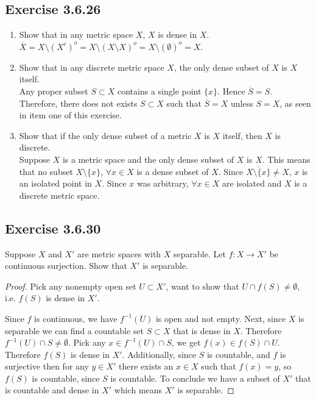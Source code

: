 \documentclass{tufte-book}
\theoremstyle{mytheoremstyle}
\theoremstyle{mylemstyle}
\theoremstyle{mydefstyle}
\begin{document}
\subsection{Exercise 3.6.26}
\begin{enumerate}

\item Show that in any metric space $X$, $X$ is dense in $X$.\\
$\overline{X} = X \setminus (X^c)^o = X\setminus(X \setminus X)^o = X\setminus (\emptyset)^o = X$.

\item Show that in any discrete metric space $X$, the only dense subset of $X$ is $X$ itself.\\
Any proper subset $S \subset X$ contains a single point $\{x\}$.  Hence $\overline{S} = S$.  Therefore, there does not exists $S \subset X$ such that $\overline{S} = X$ unless $S = X$, as seen in item one of this exercise.

\item Show that if the only dense subset of a metric $X$ is $X$ itself, then $X$ is discrete.\\
Suppose $X$ is a metric space and the only dense subset of $X$ is $X$.  This means that no subset $X\setminus\{x\}$, $\forall x \in X$ is a dense subset of $X$.  Since $\overline{X\setminus\{x\}} \neq X$, $x$ is an isolated point in $X$.  Since $x$ was arbitrary, $\forall x \in X$ are isolated and $X$ is a discrete metric space.
\end{enumerate}


\subsection{Exercise 3.6.30}
Suppose $X$ and $X'$ are metric spaces with $X$ separable.  Let $f:X \to X'$ be continuous surjection.  Show that $X'$ is separable.
\begin{proof}
Pick any nonempty open set $U \subset X'$, want to show that $U \cap f(S) \neq \emptyset$, i.e. $f(S)$ is dense in $X'$.

Since $f$ is continuous, we have $f^{-1}(U)$ is open and not empty.  Next, since $X$ is separable we can find a countable set $S \subset X$ that is dense in $X$. Therefore $f^{-1}(U) \cap S \neq \emptyset$.  Pick any $x \in f^{-1}(U) \cap S$, we get $f(x) \in f(S) \cap U$.  Therefore $f(S)$ is dense in $X'$.  Additionally, since $S$ is countable, and $f$ is surjective then for any $y \in X'$ there exists an $x \in X$ such that $f(x) = y$, so $f(S)$ is countable, since $S$ is countable.  To conclude we have a subset of $X'$ that is countable and dense in $X'$ which means $X'$ is separable. 
\end{proof}
\end{document}
